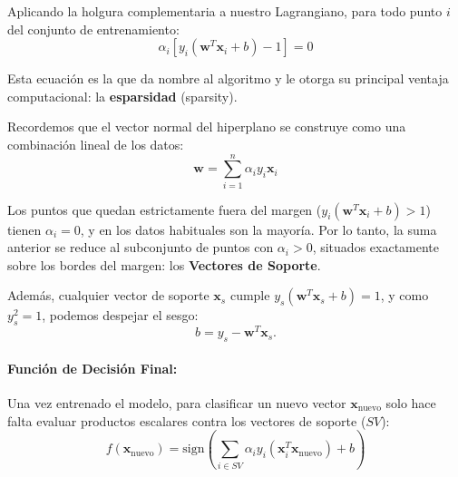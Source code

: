 \documentclass[12pt, a4paper]{article}
\begin{document}
\noindent Aplicando la holgura complementaria a nuestro Lagrangiano, para todo punto $i$ del conjunto de entrenamiento:
\[ \alpha_i [y_i(\mathbf{w}^T \mathbf{x}_i + b) - 1] = 0 \]

\noindent Esta ecuación es la que da nombre al algoritmo y le otorga su principal ventaja computacional: la \textbf{esparsidad} (sparsity).

\noindent Recordemos que el vector normal del hiperplano se construye como una combinación lineal de los datos:
\[ \mathbf{w} = \sum_{i=1}^n \alpha_i y_i \mathbf{x}_i \]

\noindent Los puntos que quedan estrictamente fuera del margen ($y_i(\mathbf{w}^T \mathbf{x}_i + b) > 1$) tienen $\alpha_i = 0$, y en los datos habituales son la mayoría. Por lo tanto, la suma anterior se reduce al subconjunto de puntos con $\alpha_i > 0$, situados exactamente sobre los bordes del margen: los \textbf{Vectores de Soporte}.

\noindent Además, cualquier vector de soporte $\mathbf{x}_s$ cumple $y_s(\mathbf{w}^T\mathbf{x}_s + b) = 1$, y como $y_s^2 = 1$, podemos despejar el sesgo:
\[ b = y_s - \mathbf{w}^T \mathbf{x}_s. \]

\paragraph{Función de Decisión Final:}
Una vez entrenado el modelo, para clasificar un nuevo vector $\mathbf{x}_{\text{nuevo}}$ solo hace falta evaluar productos escalares contra los vectores de soporte ($SV$):
\[ f(\mathbf{x}_{\text{nuevo}}) = \text{sign} \left( \sum_{i \in SV} \alpha_i y_i (\mathbf{x}_i^T \mathbf{x}_{\text{nuevo}}) + b \right) \]
\end{document}

